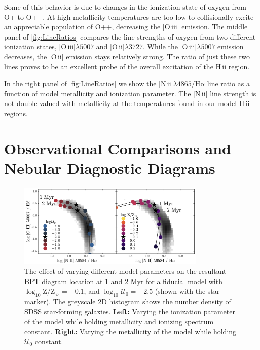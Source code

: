 \documentclass[twocolumn, tighten]{aastex61}
\newcommand{\Fig}[1]{\autoref{fig:#1}}
\newcommand{\logten}{\ensuremath{\log_{10}}}
\newcommand{\nii}{[N\,{\sc ii}]\xspace}
\newcommand{\oiii}{[O\,{\sc iii}]\xspace}
\newcommand{\oii}{[O\,{\sc ii}]\xspace}
\newcommand{\ha}{\ensuremath{\mathrm{H\alpha}}}
\newcommand{\hii}{H\,{\sc ii}\xspace}
\newcommand\lam[1]{\ensuremath{\lambda #1}}
\newcommand{\logZeq}[1]{\ensuremath{\logten \mathrm{Z}/\mathrm{Z}_{\sun} = #1}}
\newcommand{\U}{\ensuremath{\mathcal{U}_{0}}}
\newcommand{\logU}{\ensuremath{\logten \mathcal{U}_0}}
\newcommand\niiha{\nii{}\lam{4865}/\ha{}}
\begin{document}
Some of this behavior is due to changes in the ionization state of oxygen from O+ to O++. At high metallicity temperatures are too low to collisionally excite an appreciable population of O++, decreasing the \oiii{} emission. The middle panel of \Fig{LineRatios} compares the line strengths of oxygen from two different ionization states, \oiii{}\lam{5007} and \oii{}\lam{3727}. While the \oiii{}\lam{5007} emission decreases, the \oii{} emission stays relatively strong. The ratio of just these two lines proves to be an excellent probe of the overall excitation of the \hii region.

In the right panel of \Fig{LineRatios} we show the \niiha{} line ratio as a function of model metallicity and ionization parameter. The \nii{} line strength is not double-valued with metallicity at the temperatures found in our model \hii regions.

\section{Observational Comparisons and Nebular Diagnostic Diagrams} \label{sec:models:diagnostics}

\begin{figure}[ht!]
    \begin{centering}
        \includegraphics[width=0.8\textwidth]{f15.pdf}
        \caption{The effect of varying different model parameters on the resultant BPT diagram location at 1 and 2 Myr for a fiducial model with \logZeq{-0.1}, and $\logU = -2.5$ (shown with the star marker). The greyscale 2D histogram shows the number density of SDSS star-forming galaxies. \textbf{Left:} Varying the ionization parameter of the model while holding metallicity and ionizing spectrum constant. \textbf{Right:} Varying the metallicity of the model while holding \U{} constant.}
        \label{fig:BPTintro}
    \end{centering}
\end{figure}
\end{document}
